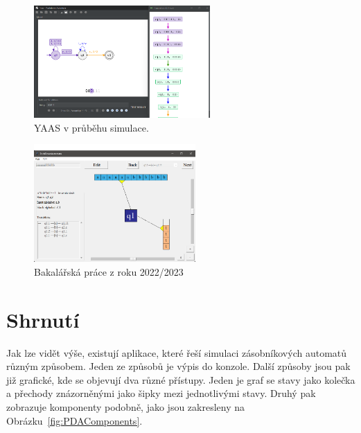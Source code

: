 \begin{figure}[h]
    \centering
    \includegraphics[width=0.6\textwidth]{Figures/PrntScrn_YAAS.png}
    \caption{YAAS v průběhu simulace.}\label{fig:YAAS}
\end{figure}

\begin{figure}[h]
    \centering
    \includegraphics[width=0.55\textwidth]{Figures/PrntScrn_BP.png}
    \caption{Bakalářská práce z roku 2022/2023}\label{fig:BP}
\end{figure}

\section{Shrnutí}

Jak lze vidět výše, existují aplikace, které řeší simulaci zásobníkových automatů různým způsobem. Jeden ze způsobů je výpis do konzole. Další způsoby jsou pak již grafické, kde se objevují dva různé přístupy. Jeden je graf se stavy jako kolečka a přechody znázorněnými jako šipky mezi jednotlivými stavy. Druhý pak zobrazuje komponenty podobně, jako jsou zakresleny na Obrázku~\ref{fig:PDAComponents}.

\endinput